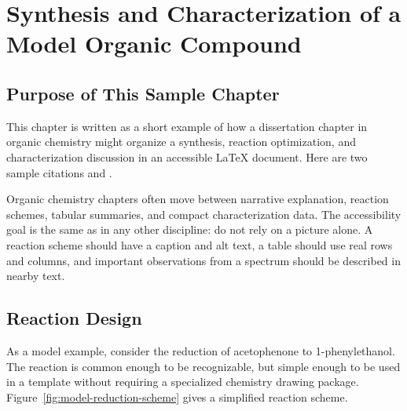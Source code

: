 \chapter{Synthesis and Characterization of a Model Organic Compound}
\label{chap-two}

\section{Purpose of This Sample Chapter}
\label{sec:organic-purpose}

This chapter is written as a short example of how a dissertation chapter in organic chemistry might organize a synthesis, reaction optimization, and characterization discussion in an accessible LaTeX document. Here are two sample citations \citep{sample:organic-methods} and \citep{sample:nmr-reporting}.

Organic chemistry chapters often move between narrative explanation, reaction schemes, tabular summaries, and compact characterization data. The accessibility goal is the same as in any other discipline: do not rely on a picture alone. A reaction scheme should have a caption and alt text, a table should use real rows and columns, and important observations from a spectrum should be described in nearby text.

\section{Reaction Design}
\label{sec:reaction-design}

As a model example, consider the reduction of acetophenone to 1-phenylethanol. The reaction is common enough to be recognizable, but simple enough to be used in a template without requiring a specialized chemistry drawing package. Figure~\ref{fig:model-reduction-scheme} gives a simplified reaction scheme.

